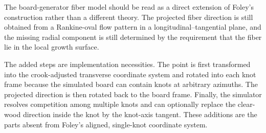 \documentclass[11pt]{article}
\begin{document}
The board-generator fiber model should be read as a direct extension of Foley's construction rather than a
different theory. The projected fiber direction is still obtained from a Rankine-oval flow pattern in a
longitudinal--tangential plane, and the missing radial component is still determined by the requirement that
the fiber lie in the local growth surface.

The added steps are implementation necessities. The point is first transformed into the crook-adjusted
transverse coordinate system and rotated into each knot frame because the simulated board can contain knots at
arbitrary azimuths. The projected direction is then rotated back to the board frame. Finally, the simulator
resolves competition among multiple knots and can optionally replace the clear-wood direction inside the knot
by the knot-axis tangent. These additions are the parts absent from Foley's aligned, single-knot coordinate
system.
\end{document}
